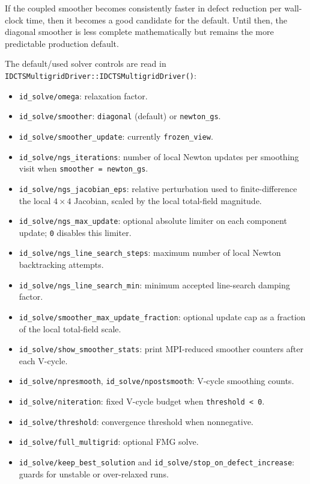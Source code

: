 \documentclass[11pt]{article}
\newcommand{\code}[1]{\texttt{#1}}
\begin{document}
If the coupled smoother becomes consistently faster in defect reduction per
wall-clock time, then it becomes a good candidate for the default.  Until then,
the diagonal smoother is less complete mathematically but remains the more
predictable production default.

The default/used solver controls are read in
\code{IDCTSMultigridDriver::IDCTSMultigridDriver()}:
\begin{itemize}
  \item \code{id\_solve/omega}: relaxation factor.
  \item \code{id\_solve/smoother}: \code{diagonal} (default) or
        \code{newton\_gs}.
  \item \code{id\_solve/smoother\_update}: currently \code{frozen\_view}.
  \item \code{id\_solve/ngs\_iterations}: number of local Newton updates per
        smoothing visit when \code{smoother = newton\_gs}.
  \item \code{id\_solve/ngs\_jacobian\_eps}: relative perturbation used to
        finite-difference the local \(4\times4\) Jacobian, scaled by the local
        total-field magnitude.
  \item \code{id\_solve/ngs\_max\_update}: optional absolute limiter on each
        component update; \code{0} disables this limiter.
  \item \code{id\_solve/ngs\_line\_search\_steps}: maximum number of local
        Newton backtracking attempts.
  \item \code{id\_solve/ngs\_line\_search\_min}: minimum accepted line-search
        damping factor.
  \item \code{id\_solve/smoother\_max\_update\_fraction}: optional update cap
        as a fraction of the local total-field scale.
  \item \code{id\_solve/show\_smoother\_stats}: print MPI-reduced smoother
        counters after each V-cycle.
  \item \code{id\_solve/npresmooth}, \code{id\_solve/npostsmooth}: V-cycle
        smoothing counts.
  \item \code{id\_solve/niteration}: fixed V-cycle budget when
        \code{threshold < 0}.
  \item \code{id\_solve/threshold}: convergence threshold when nonnegative.
  \item \code{id\_solve/full\_multigrid}: optional FMG solve.
  \item \code{id\_solve/keep\_best\_solution} and
        \code{id\_solve/stop\_on\_defect\_increase}: guards for unstable or
        over-relaxed runs.
\end{itemize}
\end{document}
